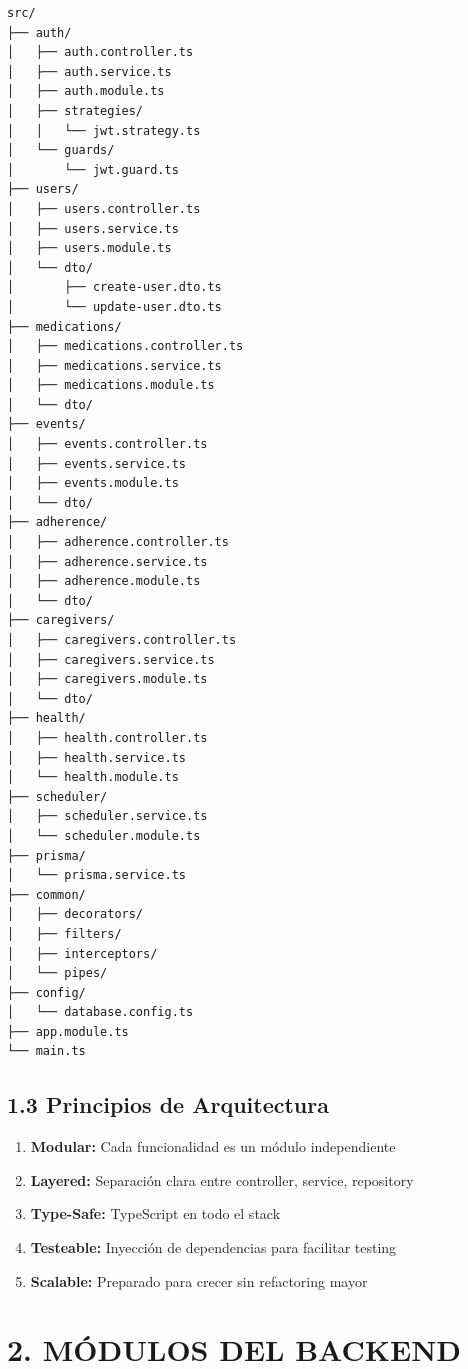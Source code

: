 \documentclass[12pt,a4paper]{article}
\begin{document}
\begin{verbatim}
src/
├── auth/
│   ├── auth.controller.ts
│   ├── auth.service.ts
│   ├── auth.module.ts
│   ├── strategies/
│   │   └── jwt.strategy.ts
│   └── guards/
│       └── jwt.guard.ts
├── users/
│   ├── users.controller.ts
│   ├── users.service.ts
│   ├── users.module.ts
│   └── dto/
│       ├── create-user.dto.ts
│       └── update-user.dto.ts
├── medications/
│   ├── medications.controller.ts
│   ├── medications.service.ts
│   ├── medications.module.ts
│   └── dto/
├── events/
│   ├── events.controller.ts
│   ├── events.service.ts
│   ├── events.module.ts
│   └── dto/
├── adherence/
│   ├── adherence.controller.ts
│   ├── adherence.service.ts
│   ├── adherence.module.ts
│   └── dto/
├── caregivers/
│   ├── caregivers.controller.ts
│   ├── caregivers.service.ts
│   ├── caregivers.module.ts
│   └── dto/
├── health/
│   ├── health.controller.ts
│   ├── health.service.ts
│   └── health.module.ts
├── scheduler/
│   ├── scheduler.service.ts
│   └── scheduler.module.ts
├── prisma/
│   └── prisma.service.ts
├── common/
│   ├── decorators/
│   ├── filters/
│   ├── interceptors/
│   └── pipes/
├── config/
│   └── database.config.ts
├── app.module.ts
└── main.ts
\end{verbatim}

\subsection{1.3 Principios de Arquitectura}

\begin{enumerate}
    \item \textbf{Modular:} Cada funcionalidad es un módulo independiente
    \item \textbf{Layered:} Separación clara entre controller, service, repository
    \item \textbf{Type-Safe:} TypeScript en todo el stack
    \item \textbf{Testeable:} Inyección de dependencias para facilitar testing
    \item \textbf{Scalable:} Preparado para crecer sin refactoring mayor
\end{enumerate}

\section{2. MÓDULOS DEL BACKEND}
\end{document}
